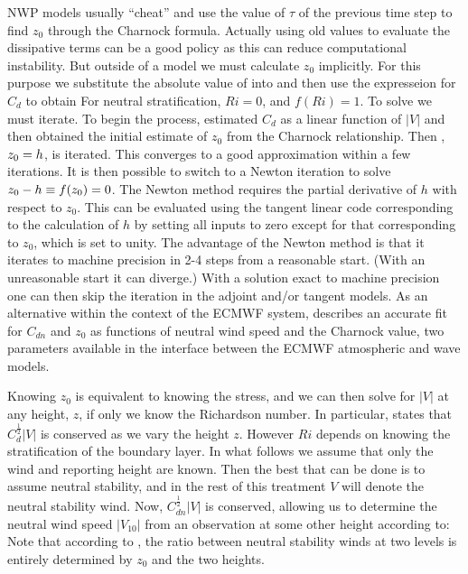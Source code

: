 \documentclass[12pt,notitlepage]{article}
\newcommand{\z}[1]{\mbox{$ z_{#1} $}}
\begin{document}
NWP models usually ``cheat'' and use the value of $\tau$ of the
previous time step to find \z0 through the Charnock formula.
Actually using old values to evaluate the dissipative terms can be a
good policy as this can reduce computational instability.
But outside of a model we must calculate \z0 implicitly.
For this purpose we substitute the absolute value of  into 
 and then use the expresseion for $C_d$ to obtain
\eql{hz}{\z0 = \frac{a}{g} C_d |V|^2 = \frac{a}{g} f(Ri)
\left[\frac{k|V|}{\log\left(\frac{\displaystyle z}{\z0}\right)}\right]^2 
\equiv h(\z0; |V|, z, Ri).} 
For neutral stratification, $Ri = 0$, and $f(Ri) = 1$.
To solve  we must iterate.
To begin the process, \cite{HofL90} estimated $C_d$ as a linear
function of $|V|$ and then obtained the initial estimate of \z0 from
the Charnock relationship.
Then , $\z0 = h$, is iterated.
This converges to a good approximation within a few iterations.
It is then possible to switch to a Newton iteration to solve $\z0 - h
\equiv f(\z0) = 0$.
The Newton method requires the partial derivative of $h$ with respect
to \z0.
This can be evaluated using the tangent linear code corresponding to the
calculation of $h$ by setting all inputs to zero except for that
corresponding to \z0, which is set to unity.
The advantage of the Newton method is that it iterates to machine
precision in 2-4 steps from a reasonable start.
(With an unreasonable start it can diverge.)
With a solution exact to machine precision one can then skip the
iteration in the adjoint and/or tangent models.
As an alternative within the context of the ECMWF system,
\citet{Her11} describes an accurate fit for $C_{dn}$ and \z0 as
functions of neutral wind speed and the Charnock value, two parameters
available in the interface between the ECMWF atmospheric and wave
models.


Knowing \z0 is equivalent to knowing the stress, and we can then
solve  for $|V|$ at any height, $z$, if only we know the
Richardson number.
In particular,  states that $ C_d^{\frac{1}{2}} |V| $ is conserved as
we vary the height $z$.
However $Ri$ depends on knowing the stratification of the boundary
layer.
In what follows we assume that only the wind and reporting height are
known.
Then the best that can be done is to assume neutral stability, and in the
rest of this treatment $V$ will denote the neutral stability wind.
Now, $ C_{dn}^{\frac{1}{2}} |V| $ is conserved, allowing
us to determine the  neutral wind speed $|V_{10}|$
from an observation at some other height according to:
\eql{V10}{|V_{10}| = \left[ \frac{\log(10/\z0)}{\log(z/\z0)} \right] |V|.}
Note that according to , the ratio between neutral
stability winds at two levels is entirely determined by $z_0$ and the
two heights.
\end{document}
